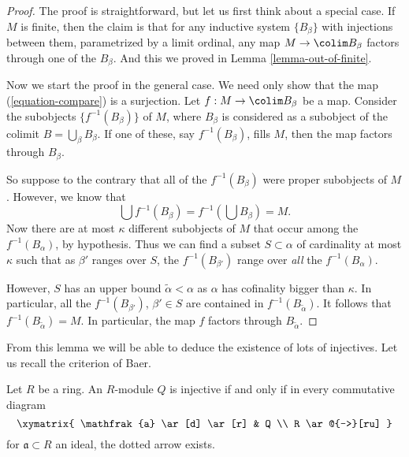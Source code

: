 \begin{proof}
The proof is straightforward, but let us first think about a special case.
If $M$ is finite, then the claim is that for any inductive system
$\{B_\beta\}$ with injections between them, parametrized by a
limit ordinal, any map $M \to \colim B_\beta$ factors through one of
the $B_\beta$. And this we proved in
Lemma \ref{lemma-out-of-finite}.

\medskip\noindent
Now we start the proof in the general case.
We need only show that the map (\ref{equation-compare}) is a surjection.
Let $f : M \to \colim B_\beta$ be a map.
Consider the subobjects $\{f^{-1}(B_\beta)\}$ of $M$, where $B_\beta$
is considered as a subobject of the colimit $B = \bigcup_\beta B_\beta$.
If one of these, say $f^{-1}(B_\beta)$, fills $M$,
then the map factors through $B_\beta$.

\medskip\noindent
So suppose to the contrary that all of the $f^{-1}(B_\beta)$ were proper
subobjects of $M$. However, we know that
$$
\bigcup f^{-1}(B_\beta) = f^{-1}\left(\bigcup B_\beta\right) = M.
$$
Now there are at most $\kappa$ different subobjects of $M$ that occur among
the $f^{-1}(B_\alpha)$, by hypothesis.
Thus we can find a subset $S \subset \alpha$ of cardinality at most
$\kappa$ such that as $\beta'$ ranges over $S$, the
$f^{-1}(B_{\beta'})$ range over \emph{all} the $f^{-1}(B_\alpha)$.

\medskip\noindent
However, $S$ has an upper bound $\widetilde{\alpha} < \alpha$ as
$\alpha$ has cofinality bigger than $\kappa$. In particular, all the
$f^{-1}(B_{\beta'})$, $\beta' \in S$ are contained in
$f^{-1}(B_{\widetilde{\alpha}})$.
It follows that $f^{-1}(B_{\widetilde{\alpha}}) = M$.
In particular, the map $f$ factors through $B_{\widetilde{\alpha}}$.
\end{proof}

\noindent
From this lemma we will be able to deduce the existence of lots of injectives.
Let us recall the criterion of Baer.

\begin{lemma}
\label{lemma-criterion-baer}
Let $R$ be a ring. An $R$-module $Q$ is injective if and only if in every
commutative diagram
$$
\xymatrix{
\mathfrak{a} \ar[d] \ar[r] &  Q \\
R \ar@{-->}[ru]
}
$$
for $\mathfrak{a} \subset R$ an ideal, the dotted arrow exists.
\end{lemma}

